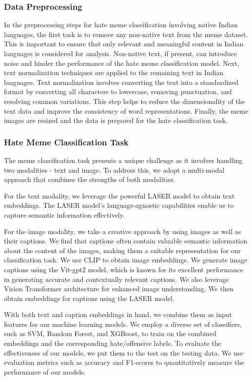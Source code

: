\documentclass{ieeeaccess}
\begin{document}
\subsubsection{Data Preprocessing}
In the preprocessing steps for hate meme classification involving native Indian languages, the first task is to remove any non-native text from the meme dataset. This is important to ensure that only relevant and meaningful content in Indian languages is considered for analysis. Non-native text, if present, can introduce noise and hinder the performance of the hate meme classification model. Next, text normalization techniques are applied to the remaining text in Indian languages. Text normalization involves converting the text into a standardized format by converting all characters to lowercase, removing punctuation, and resolving common variations. This step helps to reduce the dimensionality of the text data and improve the consistency of word representations. Finally, the meme images are resized and the data is prepared for the hate classification task.

\subsubsection{Hate Meme Classification Task}
The meme classification task presents a unique challenge as it involves handling two modalities - text and image. To address this, we adopt a multi-modal approach that combines the strengths of both modalities.

For the text modality, we leverage the powerful LASER model to obtain text embeddings. The LASER model's language-agnostic capabilities enable us to capture semantic information effectively.

For the image modality, we take a creative approach by using images as well as their captions. We find that captions often contain valuable semantic information about the content of the images, making them a suitable representation for our classification task. We use CLIP to obtain image embeddings. We generate image captions using the Vit-gpt2 model, which is known for its excellent performance in generating accurate and contextually relevant captions. We also leverage Vision Transformer architecture for enhanced image understanding. We then obtain embeddings for captions using the LASER model.

With both text and caption embeddings in hand, we combine them as input features for our machine learning models. We employ a diverse set of classifiers, such as SVM, Random Forest, and XGBoost, to train on the combined embeddings and the corresponding hate/offensive labels. To evaluate the effectiveness of our models, we put them to the test on the testing data. We use evaluation metrics such as accuracy and F1-scores to quantitatively measure the performance of our models.
\end{document}
